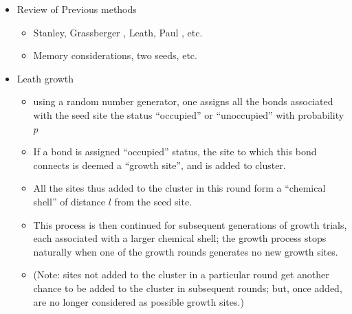 \documentclass{umthesis}          %
\begin{document}
\begin{itemize}

\item Review of Previous methods\\
\label{sec-4.2.2.1}

\begin{itemize}

\item Stanley, Grassberger \cite{Gr99}, Leath, Paul \cite{Paul2001}, etc.\\
\label{sec-4.2.2.1.1}


\item Memory considerations, two seeds, etc.\\
\label{sec-4.2.2.1.2}

\end{itemize} %

\item Leath growth \cite{Leath}\\
\label{sec-4.2.2.2}

\begin{itemize}

\item using a random number generator, one assigns all the bonds associated with the seed site the status ``occupied'' or ``unoccupied'' with probability $p$\\
\label{sec-4.2.2.2.1}


\item If a bond is assigned ``occupied'' status, the site to which this bond connects is deemed a ``growth site'', and is added to cluster.\\
\label{sec-4.2.2.2.2}


\item All the sites thus added to the cluster in this round form a ``chemical shell'' of distance $l$ from the seed site.\\
\label{sec-4.2.2.2.3}


\item This process is then continued for subsequent generations of growth trials, each associated with a larger chemical shell; the growth process stops naturally when one of the growth rounds generates no new growth sites.\\
\label{sec-4.2.2.2.4}


\item (Note: sites not added to the cluster in a particular round get another chance to be added to the cluster in subsequent rounds; but, once added, are no longer considered as possible growth sites.)\\
\label{sec-4.2.2.2.5}


\end{itemize}
\end{itemize}
\end{document}

